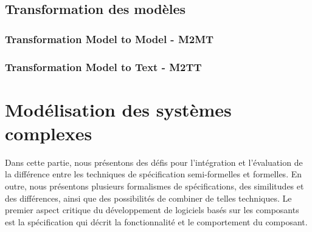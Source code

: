 \documentclass[french]{spimufcphdthesis}
\begin{document}
\subsection{Transformation des modèles}
\subsubsection{Transformation Model to Model - M2MT}
\subsubsection{Transformation Model to Text  - M2TT}

\section{Modélisation des systèmes complexes}
 Dans cette partie, nous présentons des défis pour l'intégration et l'évaluation de la différence entre les techniques de spécification semi-formelles et formelles. En outre, nous présentons plusieurs formalismes de spécifications, des similitudes et des différences, ainsi que des possibilités de combiner de telles techniques. Le premier aspect critique du développement de logiciels basés sur les composants est la spécification qui décrit la fonctionnalité et le comportement du composant.
\end{document}
